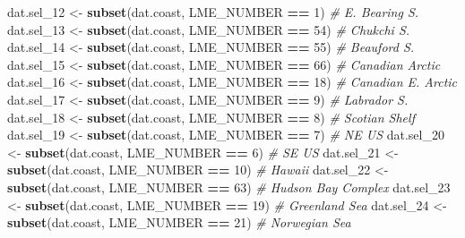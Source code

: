 \documentclass[12pt,]{article}
\newenvironment{Shaded}{\begin{snugshade}}{\end{snugshade}}
\newcommand{\CommentTok}[1]{\textcolor[rgb]{0.56,0.35,0.01}{\textit{#1}}}
\newcommand{\DecValTok}[1]{\textcolor[rgb]{0.00,0.00,0.81}{#1}}
\newcommand{\KeywordTok}[1]{\textcolor[rgb]{0.13,0.29,0.53}{\textbf{#1}}}
\newcommand{\NormalTok}[1]{#1}
\newcommand{\OperatorTok}[1]{\textcolor[rgb]{0.81,0.36,0.00}{\textbf{#1}}}
\newcommand{\StringTok}[1]{\textcolor[rgb]{0.31,0.60,0.02}{#1}}
\begin{document}
\begin{Shaded}
\begin{Highlighting}[]
\NormalTok{dat.sel_}\DecValTok{12}\NormalTok{ <-}\StringTok{ }\KeywordTok{subset}\NormalTok{(dat.coast, LME_NUMBER }\OperatorTok{==}\StringTok{ }\DecValTok{1}\NormalTok{) }\CommentTok{# E. Bearing S.}
\NormalTok{dat.sel_}\DecValTok{13}\NormalTok{ <-}\StringTok{ }\KeywordTok{subset}\NormalTok{(dat.coast, LME_NUMBER }\OperatorTok{==}\StringTok{ }\DecValTok{54}\NormalTok{) }\CommentTok{# Chukchi S.}
\NormalTok{dat.sel_}\DecValTok{14}\NormalTok{ <-}\StringTok{ }\KeywordTok{subset}\NormalTok{(dat.coast, LME_NUMBER }\OperatorTok{==}\StringTok{ }\DecValTok{55}\NormalTok{) }\CommentTok{# Beauford S.}
\NormalTok{dat.sel_}\DecValTok{15}\NormalTok{ <-}\StringTok{ }\KeywordTok{subset}\NormalTok{(dat.coast, LME_NUMBER }\OperatorTok{==}\StringTok{ }\DecValTok{66}\NormalTok{) }\CommentTok{# Canadian Arctic}
\NormalTok{dat.sel_}\DecValTok{16}\NormalTok{ <-}\StringTok{ }\KeywordTok{subset}\NormalTok{(dat.coast, LME_NUMBER }\OperatorTok{==}\StringTok{ }\DecValTok{18}\NormalTok{) }\CommentTok{# Canadian E. Arctic}
\NormalTok{dat.sel_}\DecValTok{17}\NormalTok{ <-}\StringTok{ }\KeywordTok{subset}\NormalTok{(dat.coast, LME_NUMBER }\OperatorTok{==}\StringTok{ }\DecValTok{9}\NormalTok{) }\CommentTok{# Labrador S.}
\NormalTok{dat.sel_}\DecValTok{18}\NormalTok{ <-}\StringTok{ }\KeywordTok{subset}\NormalTok{(dat.coast, LME_NUMBER }\OperatorTok{==}\StringTok{ }\DecValTok{8}\NormalTok{) }\CommentTok{# Scotian Shelf}
\NormalTok{dat.sel_}\DecValTok{19}\NormalTok{ <-}\StringTok{ }\KeywordTok{subset}\NormalTok{(dat.coast, LME_NUMBER }\OperatorTok{==}\StringTok{ }\DecValTok{7}\NormalTok{) }\CommentTok{# NE US}
\NormalTok{dat.sel_}\DecValTok{20}\NormalTok{ <-}\StringTok{ }\KeywordTok{subset}\NormalTok{(dat.coast, LME_NUMBER }\OperatorTok{==}\StringTok{ }\DecValTok{6}\NormalTok{) }\CommentTok{# SE US}
\NormalTok{dat.sel_}\DecValTok{21}\NormalTok{ <-}\StringTok{ }\KeywordTok{subset}\NormalTok{(dat.coast, LME_NUMBER }\OperatorTok{==}\StringTok{ }\DecValTok{10}\NormalTok{) }\CommentTok{# Hawaii}
\NormalTok{dat.sel_}\DecValTok{22}\NormalTok{ <-}\StringTok{ }\KeywordTok{subset}\NormalTok{(dat.coast, LME_NUMBER }\OperatorTok{==}\StringTok{ }\DecValTok{63}\NormalTok{) }\CommentTok{# Hudson Bay Complex}
\NormalTok{dat.sel_}\DecValTok{23}\NormalTok{ <-}\StringTok{ }\KeywordTok{subset}\NormalTok{(dat.coast, LME_NUMBER }\OperatorTok{==}\StringTok{ }\DecValTok{19}\NormalTok{) }\CommentTok{# Greenland Sea}
\NormalTok{dat.sel_}\DecValTok{24}\NormalTok{ <-}\StringTok{ }\KeywordTok{subset}\NormalTok{(dat.coast, LME_NUMBER }\OperatorTok{==}\StringTok{ }\DecValTok{21}\NormalTok{) }\CommentTok{# Norwegian Sea}

\end{Highlighting}
\end{Shaded}
\end{document}
